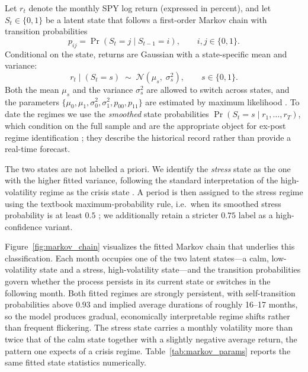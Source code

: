 Let $r_t$ denote the monthly SPY log return (expressed in percent), and let $S_t \in \{0,1\}$ be a latent state that follows a first-order Markov chain with transition probabilities
\begin{equation}
p_{ij} = \Pr\!\left(S_t = j \mid S_{t-1} = i\right), \qquad i,j \in \{0,1\}.
\label{eq:transition}
\end{equation}
Conditional on the state, returns are Gaussian with a state-specific mean and variance:
\begin{equation}
r_t \mid (S_t = s) \;\sim\; \mathcal{N}\!\left(\mu_s,\; \sigma_s^2\right), \qquad s \in \{0,1\}.
\label{eq:ms_model}
\end{equation}
Both the mean $\mu_s$ and the variance $\sigma_s^2$ are allowed to switch across states, and the parameters $\{\mu_0,\mu_1,\sigma_0^2,\sigma_1^2,p_{00},p_{11}\}$ are estimated by maximum likelihood \citep{hamilton1989new}. To date the regimes we use the \emph{smoothed} state probabilities $\Pr(S_t = s \mid r_1, \dots, r_T)$, which condition on the full sample and are the appropriate object for ex-post regime identification \citep{kim1994dynamic,kim1999statespace}; they describe the historical record rather than provide a real-time forecast.

The two states are not labelled a priori. We identify the \emph{stress} state as the one with the higher fitted variance, following the standard interpretation of the high-volatility regime as the crisis state \citep{ang2002international,guidolin2007asset}. A period is then assigned to the stress regime using the textbook maximum-probability rule, i.e.\ when its smoothed stress probability is at least $0.5$ \citep{hamilton1989new,kim1999statespace}; we additionally retain a stricter $0.75$ label as a high-confidence variant.

Figure~\ref{fig:markov_chain} visualizes the fitted Markov chain that underlies this classification. Each month occupies one of the two latent states---a calm, low-volatility state and a stress, high-volatility state---and the transition probabilities govern whether the process persists in its current state or switches in the following month. Both fitted regimes are strongly persistent, with self-transition probabilities above $0.93$ and implied average durations of roughly 16--17 months, so the model produces gradual, economically interpretable regime shifts rather than frequent flickering. The stress state carries a monthly volatility more than twice that of the calm state together with a slightly negative average return, the pattern one expects of a crisis regime. Table~\ref{tab:markov_params} reports the same fitted state statistics numerically.

